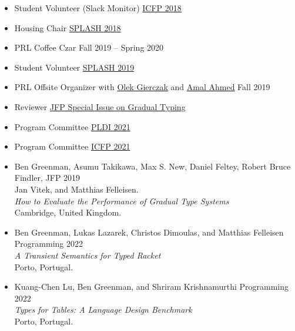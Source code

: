 \documentclass{article}
\begin{document}
\begin{itemize}
  \item {Student Volunteer (Slack Monitor)} \hfill \href{https://icfp18.sigplan.org/committee/icfp-2018-organizing-committee}{ICFP 2018}
  \item {Housing Chair} \hfill \href{https://2018.splashcon.org/committee/splash-2018-organizing-committee}{SPLASH 2018}
  \item {PRL Coffee Czar} \hfill {Fall 2019 -- Spring 2020}
  \item {Student Volunteer} \hfill \href{https://2019.splashcon.org/}{SPLASH 2019}
  \item {PRL Offsite Organizer} with \href{https://www.khoury.northeastern.edu/people/olek-gierczak/}{Olek Gierczak} and \href{http://ccs.neu.edu/home/amal/}{Amal Ahmed} \hfill {Fall 2019}
  \item {Reviewer} \hfill \href{https://www.cambridge.org/core/news/jfp-special-issue-on-gradual-typing}{JFP Special Issue on Gradual Typing}
  \item {Program Committee} \hfill \href{https://pldi21.sigplan.org/committee/pldi-2021-papers-program-committee}{PLDI 2021}
  \item {Program Committee} \hfill \href{https://icfp21.sigplan.org/committee/icfp-2021-papers-program-committee}{ICFP 2021}
\end{itemize}




\begin{itemize}
\item
  Ben Greenman, Asumu Takikawa, Max S. New, Daniel Feltey, Robert Bruce Findler, \hfill JFP 2019 \\
  Jan Vitek, and Matthias Felleisen. \\
  \emph{How to Evaluate the Performance of Gradual Type Systems} \\
  Cambridge, United Kingdom.
\item
  Ben Greenman, Lukas Lazarek, Christos Dimoulas, and Matthias Felleisen \hfill Programming 2022 \\
  \emph{A Transient Semantics for Typed Racket} \\
  Porto, Portugal.
\item
  Kuang-Chen Lu, Ben Greenman, and Shriram Krishnamurthi \hfill Programming 2022 \\
  \emph{Types for Tables: A Language Design Benchmark} \\
  Porto, Portugal.
\end{itemize}
\end{document}
